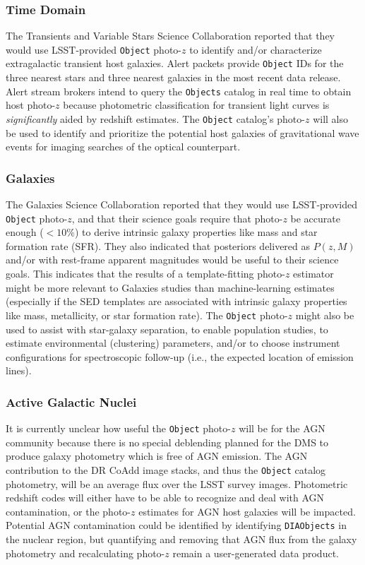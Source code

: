 \documentclass[DM,lsstdraft,toc]{lsstdoc}
\begin{document}
\subsubsection{Time Domain}\label{sssec:use_sci_td}
The Transients and Variable Stars Science Collaboration reported that they would use LSST-provided {\tt Object} photo-$z$ to identify and/or characterize extragalactic transient host galaxies.
Alert packets provide {\tt Object} IDs for the three nearest stars and three nearest galaxies in the most recent data release.
Alert stream brokers intend to query the {\tt Objects} catalog in real time to obtain host photo-$z$ because photometric classification for transient light curves is {\it significantly} aided by redshift estimates.
The {\tt Object} catalog's photo-$z$ will also be used to identify and prioritize the potential host galaxies of gravitational wave events for imaging searches of the optical counterpart.

\subsubsection{Galaxies}\label{sssec:use_sci_gal}
The Galaxies Science Collaboration reported that they would use LSST-provided {\tt Object} photo-$z$, and that their science goals require that photo-$z$ be accurate enough ($<10\%$) to derive intrinsic galaxy properties like mass and star formation rate (SFR).
They also indicated that posteriors delivered as $P(z,M)$ and/or with rest-frame apparent magnitudes would be useful to their science goals.
This indicates that the results of a template-fitting photo-$z$ estimator might be more relevant to Galaxies studies than machine-learning estimates (especially if the SED templates are associated with intrinsic galaxy properties like mass, metallicity, or star formation rate).
The {\tt Object} photo-$z$ might also be used to assist with star-galaxy separation, to enable population studies, to estimate environmental (clustering) parameters, and/or to choose instrument configurations for spectroscopic follow-up (i.e., the expected location of emission lines).

\subsubsection{Active Galactic Nuclei}\label{sssec:use_sci_agn}
It is currently unclear how useful the {\tt Object} photo-$z$ will be for the AGN community because there is no special deblending planned for the DMS to produce galaxy photometry which is free of AGN emission.
The AGN contribution to the DR CoAdd image stacks, and thus the {\tt Object} catalog photometry, will be an average flux over the LSST survey images.
Photometric redshift codes will either have to be able to recognize and deal with AGN contamination, or the photo-$z$ estimates for AGN host galaxies will be impacted.
Potential AGN contamination could be identified by identifying {\tt DIAObjects} in the nuclear region, but quantifying and removing that AGN flux from the galaxy photometry and recalculating photo-$z$ remain a user-generated data product.
\end{document}
